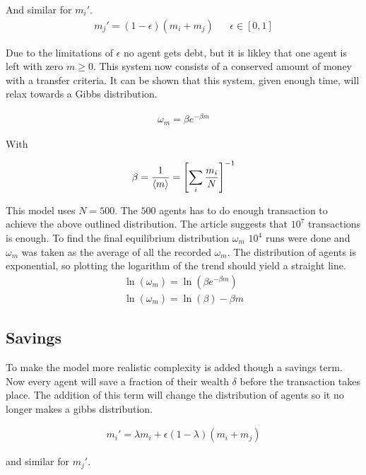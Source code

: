 And similar for $m_i'$.
\begin{align*}
	m_j'=(1-\epsilon)(m_i+m_j)&&\epsilon\in[0,1]
\end{align*}

Due to the limitations of $\epsilon$ no agent gets debt, but it is likley that one agent is left with zero $m\geq0$. This system now consists of a conserved amount of money with a transfer criteria. It can be shown that this system, given enough time, will relax towards a Gibbs distribution.

\begin{align}
	\omega_m=\beta e^{-\beta m}
\end{align}

With

\begin{align}
	\beta=\frac{1}{\langle m\rangle}=\qty[\sum_i\frac{m_i}{N}]^{-1}\label{eq:beta}
\end{align}

This model uses $N=500$. The $500$ agents has to do enough transaction to achieve the above outlined distribution. The article suggests that $10^7$ transactions is enough. \cite{patriarca} To find the final equilibrium distribution $\omega_m$ $10^4$ runs were done and $\omega_m$ was taken as the average of all the recorded $\omega_m$. The distribution of agents is exponential, so plotting the logarithm of the trend should yield a straight line.
\begin{align*}
	\ln(\omega_m)=\ln(\beta e^{-\beta m})\\
	\ln(\omega_m)=\ln(\beta)-\beta m %
\end{align*}


\subsection{Savings}
\label{sec:savings}

To make the model more realistic complexity is added though a savings term. Now every agent will save a fraction of their wealth $\delta$ before the transaction takes place. The addition of this term will change the distribution of agents so it no longer makes a gibbs distribution.

\begin{align}
	m_i'=\lambda m_i+\epsilon(1-\lambda)(m_i+m_j)\label{savingsterm1}
\end{align}

and similar for $m_j'$.
 
